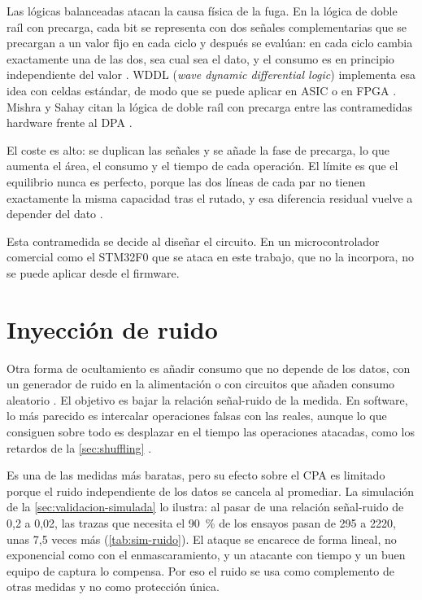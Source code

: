 Las lógicas balanceadas atacan la causa física de la fuga. En la lógica de
doble raíl con precarga, cada bit se representa con dos señales
complementarias que se precargan a un valor fijo en cada ciclo y después se
evalúan: en cada ciclo cambia exactamente una de las dos, sea cual sea el
dato, y el consumo es en principio independiente del valor
\cite{tiri2004wddl}. WDDL (\emph{wave dynamic differential logic}) implementa
esa idea con celdas estándar, de modo que se puede aplicar en ASIC o en FPGA
\cite{tiri2004wddl}. Mishra y Sahay citan la lógica de doble raíl con precarga
entre las contramedidas hardware frente al DPA
\cite[sec.~III.D]{mishra2025modern}.

El coste es alto: se duplican las señales y se añade la fase de precarga, lo que
aumenta el área, el consumo y el tiempo de cada operación. El límite es que el
equilibrio nunca es perfecto, porque las dos líneas de cada par no tienen
exactamente la misma capacidad tras el rutado, y esa diferencia residual
vuelve a depender del dato \cite[caps.~7 y~8]{mangard2007power}.

Esta contramedida se decide al diseñar el circuito. En un microcontrolador
comercial como el STM32F0 que se ataca en este trabajo, que no la incorpora,
no se puede aplicar desde el firmware.

\section{Inyección de ruido}
\label{sec:ruido}

Otra forma de ocultamiento es añadir consumo que no depende de los datos, con
un generador de ruido en la alimentación o con circuitos que añaden consumo
aleatorio \cite[sec.~III.D]{mishra2025modern}. El objetivo es bajar la
relación señal-ruido de la medida. En software, lo más parecido es intercalar
operaciones falsas con las reales, aunque lo que consiguen sobre todo es
desplazar en el tiempo las operaciones atacadas, como los retardos de la
\cref{sec:shuffling} \cite[cap.~7]{mangard2007power}.

Es una de las medidas más baratas, pero su efecto sobre el CPA es limitado
porque el ruido independiente de los datos se cancela al promediar. La
simulación de la \cref{sec:validacion-simulada} lo ilustra: al pasar de una
relación señal-ruido de 0,2 a 0,02, las trazas que necesita el 90~\% de los
ensayos pasan de 295 a 2220, unas 7,5 veces más (\cref{tab:sim-ruido}). El ataque se encarece de forma lineal, no exponencial
como con el enmascaramiento, y un atacante con tiempo y un buen equipo de
captura lo compensa. Por eso el ruido se usa como complemento de otras medidas y
no como protección única.

